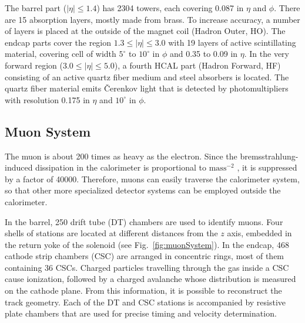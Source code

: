The barrel part ($|\eta| \leq 1.4$) has 2304 towers, each covering 0.087 in $\eta$ and $\phi$. There are 15 absorption layers, mostly made from brass. To increase accuracy, a number of layers is placed at the outside of the magnet coil (Hadron Outer, HO). The endcap parts cover the region $1.3 \leq |\eta| \leq 3.0$ with 19 layers of active scintillating material, covering cell of width $5^\circ$ to $10^\circ$ in $\phi$ and 0.35 to 0.09 in $\eta$. In the very forward region ($3.0 \leq |\eta| \leq 5.0$), a fourth HCAL part (Hadron Forward, HF) consisting of an active quartz fiber medium and steel absorbers is located. The quartz fiber material emits Čerenkov light that is detected by photomultipliers with resolution 0.175 in $\eta$ and $10^\circ$ in $\phi$.

\subsection{Muon System}
The muon is about 200 times as heavy as the electron. Since the bremsstrahlung-induced dissipation in the calorimeter is proportional to $\text{mass}^{-2}$ \cite{bock2013particle}, it is suppressed by a factor of 40000. Therefore, muons can easily traverse the calorimeter system, so that other more specialized detector systems can be employed outside the calorimeter.

In the barrel, 250 drift tube (DT) chambers are used to identify muons. Four shells of stations are located at different distances from the $z$ axis, embedded in the return yoke of the solenoid (see Fig.~\ref{fig:muonSystem}). In the endcap, 468 cathode strip chambers (CSC) are arranged in concentric rings, most of them containing 36 CSCs. Charged particles travelling through the gas inside a CSC cause ionization, followed by a charged avalanche whose distribution is measured on the cathode plane. From this information, it is possible to reconstruct the track geometry. Each of the DT and CSC stations is accompanied by resistive plate chambers that are used for precise timing and velocity determination.

